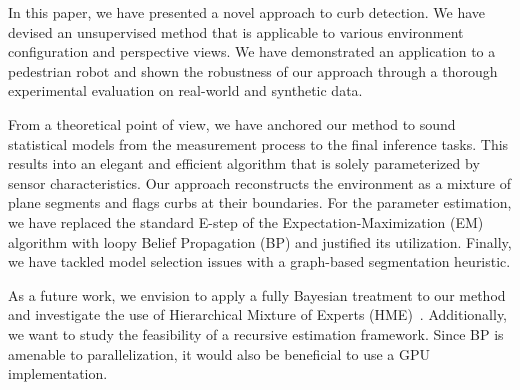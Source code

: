 In this paper, we have presented a novel approach to curb detection. We have
devised an unsupervised method that is applicable to various environment
configuration and perspective views. We have demonstrated an application to a
pedestrian robot and shown the robustness of our approach through a thorough
experimental evaluation on real-world and synthetic data.

From a theoretical point of view, we have anchored our method to sound
statistical models from the measurement process to the final inference tasks.
This results into an elegant and efficient algorithm that is solely
parameterized by sensor characteristics. Our approach reconstructs the
environment as a mixture of plane segments and flags curbs at their boundaries.
For the parameter estimation, we have replaced the standard E-step of the
Expectation-Maximization (EM) algorithm with loopy Belief Propagation (BP) and
justified its utilization. Finally, we have tackled model selection issues with
a graph-based segmentation heuristic.

As a future work, we envision to apply a fully Bayesian treatment to our
method and investigate the use of Hierarchical Mixture of Experts
(HME)~\cite{jordan94hierarchical,bishop03bayesian}. Additionally, we want to
study the feasibility of a recursive estimation framework. Since BP is amenable
to parallelization, it would also be beneficial to use a GPU implementation.
